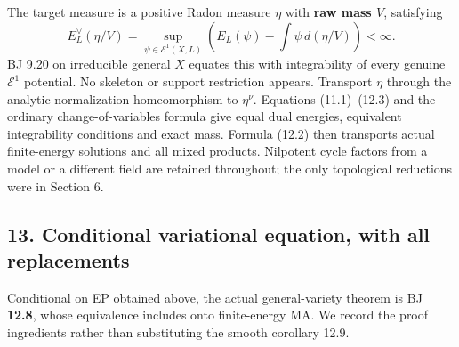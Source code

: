 \documentclass[
  10pt,
]{article}
\begin{document}
The target measure is a positive Radon measure \(\eta\) with \textbf{raw
mass \(V\)}, satisfying
\[E_L^\vee(\eta/V)=\sup_{\psi\in\mathcal E^1(X,L)}
\left(E_L(\psi)-\int\psi\,d(\eta/V)\right)<\infty.                       \tag{12.4}\]
BJ 9.20 on irreducible general \(X\) equates this with integrability of
every genuine \(\mathcal E^1\) potential. No skeleton or support
restriction appears. Transport \(\eta\) through the analytic
normalization homeomorphism to \(\eta^\nu\). Equations (11.1)--(12.3)
and the ordinary change-of-variables formula give equal dual energies,
equivalent integrability conditions and exact mass. Formula (12.2) then
transports actual finite-energy solutions and all mixed products.
Nilpotent cycle factors from a model or a different field are retained
throughout; the only topological reductions were in Section 6.

\subsection{13. Conditional variational equation, with all
replacements}\label{conditional-variational-equation-with-all-replacements}

Conditional on EP obtained above, the actual general-variety theorem is
BJ \textbf{12.8}, whose equivalence includes onto finite-energy MA. We
record the proof ingredients rather than substituting the smooth
corollary 12.9.
\end{document}
